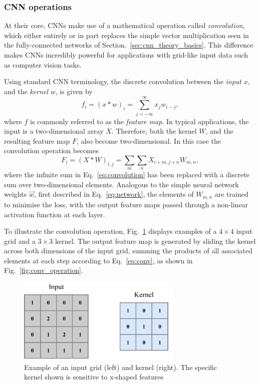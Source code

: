 \subsubsection*{CNN operations} %

At their core, CNNs make use of a mathematical operation called \emph{convolution}, which either
entirely or in part replaces the simple vector multiplication seen in the fully-connected networks
of Section.~\ref{sec:cnn_theory_basics}. This difference makes CNNs incredibly powerful for
applications with grid-like input data such as computer vision tasks.

Using standard CNN terminology, the discrete convolution between the \emph{input} $x$, and the
\emph{kernel} $w$, is given by
\begin{equation}
    f_{i}=(x*w)_{i}=\sum^{\infty}_{j=-\infty}x_{j}w_{i-j},
    \label{eq:convolution}
\end{equation}
where $f$ is commonly referred to as the \emph{feature map}. In typical applications, the input is
a two-dimensional array $X$. Therefore, both the kernel $W$, and the resulting feature map $F$,
also become two-dimensional. In this case the convolution operation becomes
\begin{equation}
    F_{i}=(X*W)_{i,j}=\sum_{m}\sum_{n}X_{i+m,j+n}W_{m,n},
    \label{eq:conv}
\end{equation}
where the infinite sum in Eq.~\ref{eq:convolution} has been replaced with a discrete sum over
two-dimensional elements. Analogous to the simple neural network weights $\vec{w}$, first
described in Eq.~\ref{eq:network}, the elements of $W_{m,n}$ are trained to minimise the loss,
with the output feature maps passed through a non-linear activation function at each layer.

To illustrate the convolution operation, Fig.~\ref{fig:conv_input} displays examples of a $4
\times 4$ input grid and a $3 \times 3$ kernel. The output feature map is generated by sliding the
kernel across both dimensions of the input grid, summing the products of all associated elements
at each step according to Eq.~\ref{eq:conv}, as shown in Fig.~\ref{fig:conv_operation}.

\begin{figure} %
    \includegraphics[width=0.7\textwidth]{diagrams/6-cnn/conv_input.pdf}
    \caption[Example of a Convolutional Neural Network input grid and kernel]
    {Example of an input grid (left) and kernel (right). The specific kernel shown is sensitive to
        x-shaped features}
    \label{fig:conv_input}
\end{figure}

